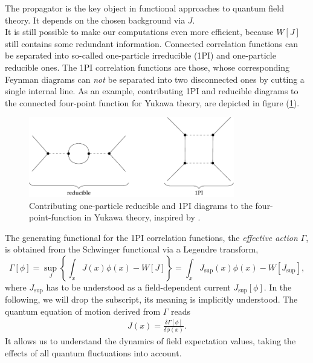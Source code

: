 The propagator is the key object in functional approaches to quantum field theory. It depends on the chosen background via $J$. \\
It is still possible to make our computations even more efficient, because $W[J]$ still contains some redundant information. Connected correlation functions can be separated into so-called one-particle irreducible (1PI) and one-particle reducible ones. The 1PI correlation functions are those, whose corresponding Feynman diagrams can \textit{not} be separated into two disconnected ones by cutting a single internal line. As an example, contributing 1PI and reducible diagrams to the connected four-point function for Yukawa theory, are depicted in figure (\ref{fig:1PI_Yukawa}). \\
\begin{figure}[t]
\centering
\includegraphics[width=0.8\textwidth]{figs/TikZ/1PI_Yukawa}
\caption[Contributing one-particle reducible and 1PI diagrams to the four-point-function in Yukawa theory]{Contributing one-particle reducible and 1PI diagrams to the four-point-function in Yukawa theory, inspired by \cite{FloerchingerWetterichQFT}.}	
\label{fig:1PI_Yukawa}
\hrulefill
\end{figure}
The generating functional for the  1PI correlation functions, the \textit{effective action} $\Gamma$, is obtained from the Schwinger functional via a Legendre transform, 
\begin{equation}
	\Gamma[\phi]=\sup _{J}\left\{\int_{x} J(x) \phi(x)-W[J]\right\}=\int_{x} J_{\mathrm{sup}}(x) \phi(x)-W\left[J_{\mathrm{sup}}\right],
\label{eqn:Def_Gamma}
\end{equation}
where $J_{\mathrm{sup}}$ has to be understood as a field-dependent current $J_{\mathrm{sup}}[\phi]$. In the following, we will drop the subscript, its meaning is implicitly understood. 
The quantum equation of motion derived from $\Gamma$ reads
\begin{align}
	J(x) = \frac{\delta\Gamma[\phi]}{\delta\phi(x)}.
	\label{eqn:quantum_eom}
\end{align}
It allows us to understand the dynamics of field expectation values, taking the effects of all quantum fluctuations into account.
